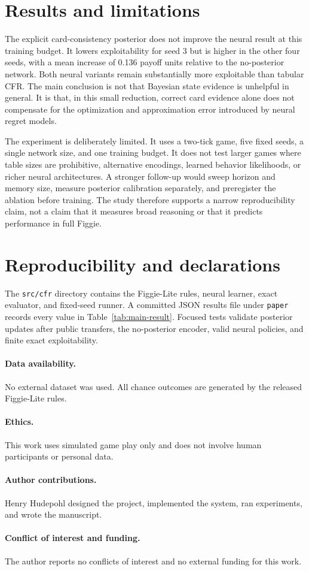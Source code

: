 \section{Results and limitations}

The explicit card-consistency posterior does not improve the neural result at this training budget. It lowers exploitability for seed 3 but is higher in the other four seeds, with a mean increase of 0.136 payoff units relative to the no-posterior network. Both neural variants remain substantially more exploitable than tabular CFR. The main conclusion is not that Bayesian state evidence is unhelpful in general. It is that, in this small reduction, correct card evidence alone does not compensate for the optimization and approximation error introduced by neural regret models.

The experiment is deliberately limited. It uses a two-tick game, five fixed seeds, a single network size, and one training budget. It does not test larger games where table sizes are prohibitive, alternative encodings, learned behavior likelihoods, or richer neural architectures. A stronger follow-up would sweep horizon and memory size, measure posterior calibration separately, and preregister the ablation before training. The study therefore supports a narrow reproducibility claim, not a claim that it measures broad reasoning or that it predicts performance in full Figgie.

\section{Reproducibility and declarations}

The \texttt{src/cfr} directory contains the Figgie-Lite rules, neural learner, exact evaluator, and fixed-seed runner. A committed JSON results file under \texttt{paper} records every value in Table~\ref{tab:main-result}. Focused tests validate posterior updates after public transfers, the no-posterior encoder, valid neural policies, and finite exact exploitability.

\paragraph{Data availability.} No external dataset was used. All chance outcomes are generated by the released Figgie-Lite rules.
\paragraph{Ethics.} This work uses simulated game play only and does not involve human participants or personal data.
\paragraph{Author contributions.} Henry Hudepohl designed the project, implemented the system, ran experiments, and wrote the manuscript.
\paragraph{Conflict of interest and funding.} The author reports no conflicts of interest and no external funding for this work.



